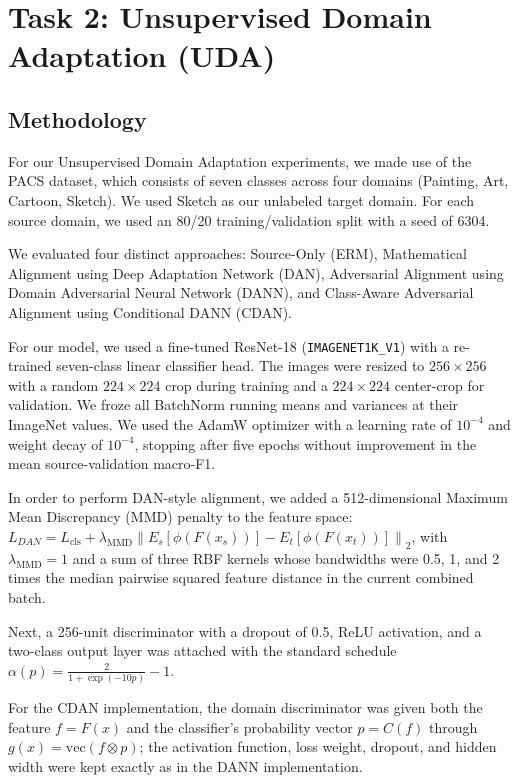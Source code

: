 \documentclass{article}
\begin{document}
\newpage
\section{Task 2: Unsupervised Domain Adaptation (UDA)}
\label{sec:task2}

\subsection{Methodology}
For our Unsupervised Domain Adaptation experiments, we made use of the PACS dataset, which consists of seven classes across four domains (Painting, Art, Cartoon, Sketch). We used Sketch as our unlabeled target domain. For each source domain, we used an 80/20 training/validation split with a seed of 6304.

We evaluated four distinct approaches: Source-Only (ERM), Mathematical Alignment using Deep Adaptation Network (DAN), Adversarial Alignment using Domain Adversarial Neural Network (DANN), and Class-Aware Adversarial Alignment using Conditional DANN (CDAN).

For our model, we used a fine-tuned ResNet-18 (\texttt{IMAGENET1K\_V1}) with a re-trained seven-class linear classifier head. The images were resized to $256 \times 256$ with a random $224 \times 224$ crop during training and a $224 \times 224$ center-crop for validation. We froze all BatchNorm running means and variances at their ImageNet values. We used the AdamW optimizer with a learning rate of $10^{-4}$ and weight decay of $10^{-4}$, stopping after five epochs without improvement in the mean source-validation macro-F1.

In order to perform DAN-style alignment, we added a 512-dimensional Maximum Mean Discrepancy (MMD) penalty to the feature space: $L_{DAN} = L_{\text{cls}} + \lambda_{\text{MMD}} \left\| E_s[\phi(F(x_s))] - E_t[\phi(F(x_t))] \right\|_2$, with $\lambda_{\text{MMD}}=1$ and a sum of three RBF kernels whose bandwidths were 0.5, 1, and 2 times the median pairwise squared feature distance in the current combined batch.

Next, a 256-unit discriminator with a dropout of 0.5, ReLU activation, and a two-class output layer was attached with the standard schedule $\alpha(p) = \frac{2}{1 + \exp(-10p)} - 1$.

For the CDAN implementation, the domain discriminator was given both the feature $f = F(x)$ and the classifier's probability vector $p = C(f)$ through $g(x) = \text{vec}(f \otimes p)$; the activation function, loss weight, dropout, and hidden width were kept exactly as in the DANN implementation.
\end{document}

